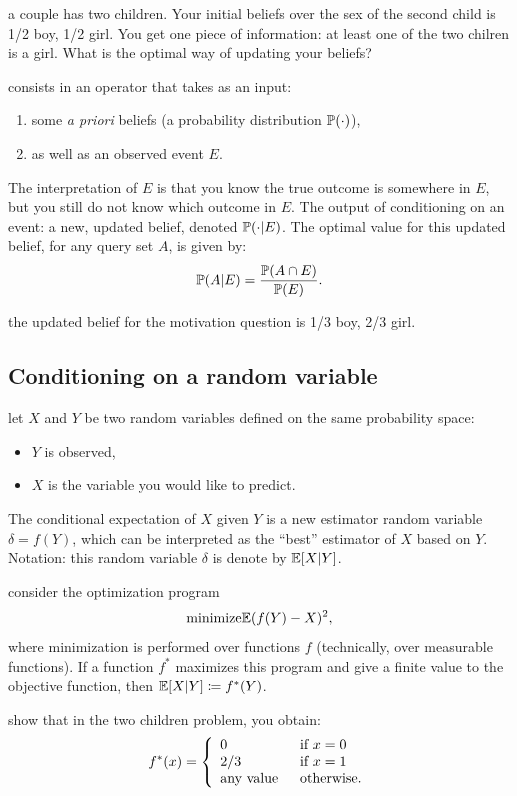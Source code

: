 \documentclass{article}
\begin{document}
 a couple has two children. Your initial beliefs over the sex of the second child is 1/2 boy, 1/2 girl. You get one piece of information: at least one of the two chilren is a girl. What is the optimal way of updating your beliefs?

 consists in an operator that takes as an input:
\begin{enumerate}
  \item some \emph{a priori} beliefs (a probability distribution $\P(\cdot)$), 
  \item as well as an observed event $E$. 
\end{enumerate}
The interpretation of $E$ is that you know the true outcome is somewhere in $E$, but you still do not know which outcome in $E$. The output of conditioning on an event: a new, updated belief, denoted $\P(\cdot | E)$. The optimal value for this updated belief, for any query set $A$, is given by:
\[ \P(A | E) = \frac{\P(A\cap E)}{\P(E)}. \]

 the updated belief for the motivation question is 1/3 boy, 2/3 girl.


\subsection{Conditioning on a random variable}

 let $X$ and $Y$ be two random variables defined on the same probability space:
\begin{itemize}
  \item $Y$ is observed,
  \item $X$ is the variable you would like to predict.
\end{itemize}
The conditional expectation of $X$ given $Y$ is a new estimator random variable $\delta = f(Y)$, which can be interpreted as the ``best'' estimator of $X$ based on $Y$. Notation: this random variable $\delta$ is denote by $\E[X|Y]$.

 consider the optimization program
\[ \text{minimize} \E(f(Y) - X)^2, \]
where minimization is performed over functions $f$ (technically, over measurable functions). If a function $f^*$ maximizes this program and give a finite value to the objective function, then $\E[X|Y] \defeq f^*(Y)$.

 show that in the two children problem, you obtain:
\[ f^*(x) = \bracearraycond{0 \;\;&\text{if }x=0\\ 2/3\;\;&\text{if }x=1\\\text{any value}\;\;&\text{otherwise.}} \]
\end{document}
